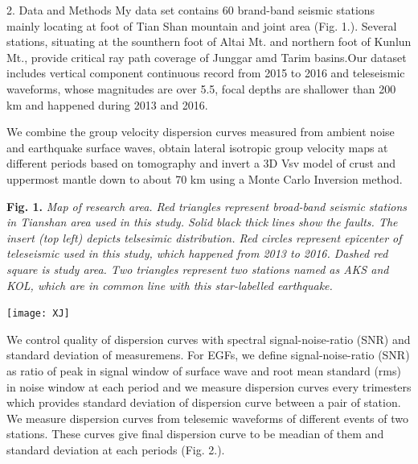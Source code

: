 \documentclass[
    landscape,      %
    paperwidth = 1200mm,
    paperheight = 900mm,
    fontscale = 0.4,
    margin = 1.7cm,
]{baposter}
\begin{document}
\begin{poster}
\begin{posterbox}[column=0, below=auto]{2. Data and Methods}
\setlength{\parskip}{3pt}
My data set contains 60 brand-band seismic stations mainly
locating at foot of Tian Shan mountain and joint area (Fig. 1.).
Several stations, situating at the sounthern foot of Altai Mt. and northern foot of Kunlun Mt.,
provide critical ray path coverage of Junggar amd Tarim basins.Our dataset includes vertical
component continuous record from 2015 to 2016 and teleseismic waveforms,
whose magnitudes are over 5.5, focal depths are shallower than 200 km and happened during
2013 and 2016.

We combine the group velocity dispersion curves measured from ambient noise and earthquake surface waves,
obtain lateral isotropic group velocity maps at different periods based on tomography and invert a 3D Vsv model of crust
and uppermost mantle down to about 70 km using a Monte Carlo Inversion method.



\begin{center}

\begin{minipage}{0.2\textwidth}
\footnotesize
\textbf{Fig. 1.}
\itshape
Map of research area. Red triangles represent broad-band seismic stations
in Tianshan area used in this study. Solid black thick lines show the faults.
The insert (top left) depicts telsesimic distribution. Red circles represent
epicenter of teleseismic used in this study, which happened from 2013 to 2016.
Dashed red square is study area. Two triangles represent two stations named as
AKS and KOL, which are in common line with this star-labelled earthquake.
\end{minipage}
\begin{minipage}{0.75\textwidth}
\texttt{[image: XJ]}
\end{minipage}
\hspace{0.1cm}

\end{center}



We control quality of dispersion curves with spectral signal-noise-ratio (SNR) and standard deviation of measuremens.
For EGFs, we define signal-noise-ratio (SNR) as ratio of peak in signal window of surface
wave and root mean standard (rms) in noise window at each period and we measure dispersion curves every trimesters
which provides standard deviation of dispersion curve between a pair of station.
We measure dispersion curves from telesemic waveforms of different events of two stations.
These curves give final dispersion curve to be meadian of them and standard deviation at each periods (Fig. 2.).


\end{posterbox}
\end{poster}
\end{document}
